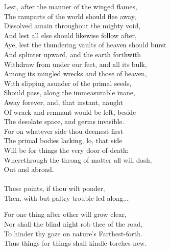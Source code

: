 Lest, after the manner of the winged flames,\\
The ramparts of the world should flee away,\\
Dissolved amain throughout the mighty void,\\
And lest all else should likewise follow after,\\
Aye, lest the thundering vaults of heaven should burst\\
And splinter upward, and the earth forthwith\\
Withdraw from under our feet, and all its bulk,\\
Among its mingled wrecks and those of heaven,\\
With slipping asunder of the primal seeds,\\
Should pass, along the immeasurable inane,\\
Away forever, and, that instant, naught\\
Of wrack and remnant would be left, beside\\
The desolate space, and germs invisible.\\
For on whatever side thou deemest first\\
The primal bodies lacking, lo, that side\\
Will be for things the very door of death:\\
Wherethrough the throng of matter all will dash,\\
Out and abroad.\\
\\
These points, if thou wilt ponder,\\
Then, with but paltry trouble led along...

For one thing after other will grow clear,\\
Nor shall the blind night rob thee of the road,\\
To hinder thy gaze on nature's Farthest-forth.\\
Thus things for things shall kindle torches new.



